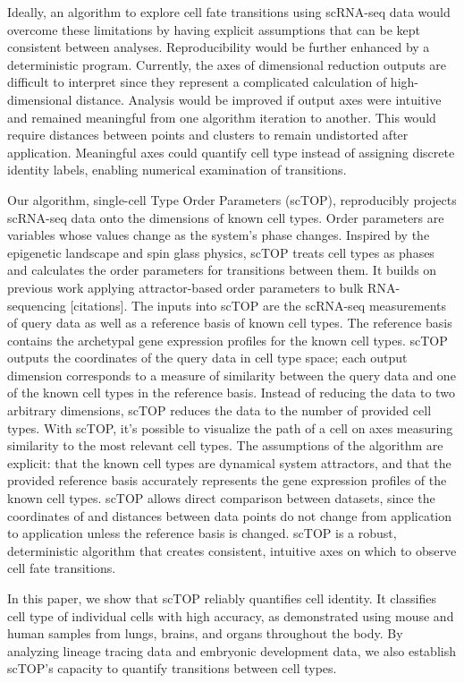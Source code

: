 \documentclass[aps,superscriptaddress, notitlepage,longbibliography]{revtex4-1}
\begin{document}
Ideally, an algorithm to explore cell fate transitions using scRNA-seq data would overcome these limitations by having explicit assumptions that can be kept consistent between analyses. Reproducibility would be further enhanced by a deterministic program. Currently, the axes of dimensional reduction outputs are difficult to interpret since they represent a complicated calculation of high-dimensional distance. Analysis would be improved if output axes were intuitive and remained meaningful from one algorithm iteration to another. This would require distances between points and clusters to remain undistorted after application. Meaningful axes could quantify cell type instead of assigning discrete identity labels, enabling numerical examination of transitions.

Our algorithm, single-cell Type Order Parameters (scTOP), reproducibly projects scRNA-seq data onto the dimensions of known cell types. Order parameters are variables whose values change as the system’s phase changes. Inspired by the epigenetic landscape and spin glass physics, scTOP treats cell types as phases and calculates the order parameters for transitions between them. It builds on previous work applying attractor-based order parameters to bulk RNA-sequencing [citations]. The inputs into scTOP are the scRNA-seq measurements of query data as well as a reference basis of known cell types. The reference basis contains the archetypal gene expression profiles for the known cell types. scTOP outputs the coordinates of the query data in cell type space; each output dimension corresponds to a measure of similarity between the query data and one of the known cell types in the reference basis. Instead of reducing the data to two arbitrary dimensions, scTOP reduces the data to the number of provided cell types. With scTOP, it’s possible to visualize the path of a cell on axes measuring similarity to the most relevant cell types. The assumptions of the algorithm are explicit: that the known cell types are dynamical system attractors, and that the provided reference basis accurately represents the gene expression profiles of the known cell types. scTOP allows direct comparison between datasets, since the coordinates of and distances between data points do not change from application to application unless the reference basis is changed. scTOP is a robust, deterministic algorithm that creates consistent, intuitive axes on which to observe cell fate transitions.

In this paper, we show that scTOP reliably quantifies cell identity. It classifies cell type of individual cells with high accuracy, as demonstrated using mouse and human samples from lungs, brains, and organs throughout the body. By analyzing lineage tracing data and embryonic development data, we also establish scTOP’s capacity to quantify transitions between cell types. 
\end{document}
